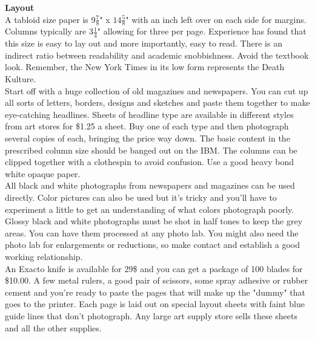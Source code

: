 \documentclass[11pt,twoside,a4paper]{book}
\begin{document}
\textbf{Layout}~\\
A tabloid size paper is $9 \frac{7}{8}$" x $14 \frac{5}{8}$" with an inch left over on each side for margins. Columns typically are $3 \frac{1}{4}$" allowing for three per page. Experience has found that this size is easy to lay out and more importantly, easy to read. There is an indirect ratio between readability and academic snobbishness. Avoid the textbook look. Remember, the New York Times in its low form represents the Death Kulture.~\\

Start off with a huge collection of old magazines and newspapers. You can cut up all sorts of letters, borders, designs and sketches and paste them together to make eye-catching headlines. Sheets of headline type are available in different styles from art stores for \$1.25 a sheet. Buy one of each type and then photograph several copies of each, bringing the price way down. The basic content in the prescribed column size should be banged out on the IBM. The columns can be clipped together with a clothespin to avoid confusion. Use a good heavy bond white opaque paper.~\\

All black and white photographs from newspapers and magazines can be used directly. Color pictures can also be used but it's tricky and you'll have to experiment a little to get an understanding of what colors photograph poorly. Glossy black and white photographs must be shot in half tones to keep the grey areas. You can have them processed at any photo lab. You might also need the photo lab for enlargements or reductions, so make contact and establish a good working relationship.~\\

An Exacto knife is available for 29\$ and you can get a package of 100 blades for \$10.00. A few metal rulers, a good pair of scissors, some spray adhesive or rubber cement and you're ready to paste the pages that will make up the "dummy" that goes to the printer. Each page is laid out on special layout sheets with faint blue guide lines that don't photograph. Any large art supply store sells these sheets and all the other supplies.~\\
\end{document}
